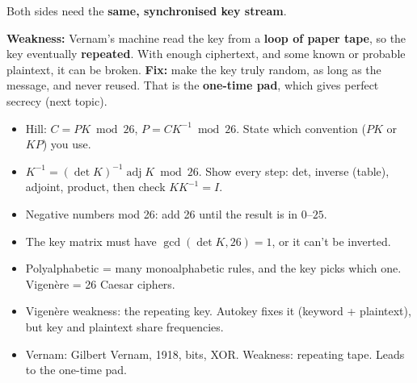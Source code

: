 \begin{center}
\end{center}
Both sides need the \textbf{same, synchronised key stream}.

\textbf{Weakness:} Vernam's machine read the key from a \textbf{loop of paper tape}, so the key eventually \textbf{repeated}. With enough ciphertext, and some known or probable plaintext, it can be broken.
\textbf{Fix:} make the key truly random, as long as the message, and never reused. That is the \textbf{one-time pad}, which gives perfect secrecy (next topic).

\begin{examtip}
\begin{itemize}
  \item Hill: $C = PK \bmod 26$, $P = CK^{-1} \bmod 26$. State which convention ($PK$ or $KP$) you use.
  \item $K^{-1} = (\det K)^{-1}\operatorname{adj}K \bmod 26$. Show every step: det, inverse (table), adjoint, product, then check $KK^{-1}=I$.
  \item Negative numbers mod 26: add 26 until the result is in $0$--$25$.
  \item The key matrix must have $\gcd(\det K, 26) = 1$, or it can't be inverted.
  \item Polyalphabetic = many monoalphabetic rules, and the key picks which one. Vigen\`ere = 26 Caesar ciphers.
  \item Vigen\`ere weakness: the repeating key. Autokey fixes it (keyword + plaintext), but key and plaintext share frequencies.
  \item Vernam: Gilbert Vernam, 1918, bits, XOR. Weakness: repeating tape. Leads to the one-time pad.
\end{itemize}
\end{examtip}

